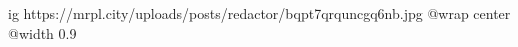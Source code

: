  
 
 
 
 

\ifcmt
  ig https://mrpl.city/uploads/posts/redactor/bqpt7qrquncgq6nb.jpg
  @wrap center
  @width 0.9
\fi
